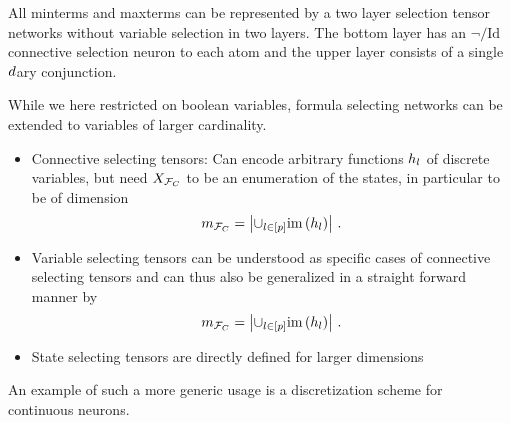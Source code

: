 \begin{remark}
    All minterms and maxterms can be represented by a two layer selection tensor networks without variable selection in two layers.
    The bottom layer has an $\lnot/\mathrm{Id}$ connective selection neuron to each atom and the upper layer consists of a single $d$ary conjunction.
\end{remark}





While we here restricted on boolean variables, formula selecting networks can be extended to variables of larger cardinality.
\begin{itemize}
    \item Connective selecting tensors: Can encode arbitrary functions $h_{l}$ of discrete variables, but need $X_{\mathcal{F}_{C}}$ to be an enumeration of the states, in particular to be of dimension
    \[ m_{\mathcal{F}_{C}} = \left| \cup_{l\in[p]} \mathrm{im}\left(h_{l}\right) \right| \, . \]
    \item Variable selecting tensors can be understood as specific cases of connective selecting tensors and can thus also be generalized in a straight forward manner by
    \[ m_{\mathcal{F}_{C}} = \left| \cup_{l\in[p]} \mathrm{im}\left(h_{l}\right) \right| \, .  \]
    \item State selecting tensors are directly defined for larger dimensions
\end{itemize}


An example of such a more generic usage is a discretization scheme for continuous neurons.

